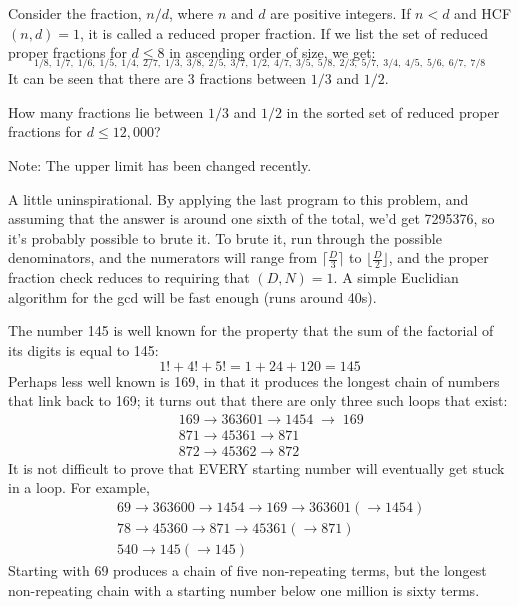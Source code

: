 


Consider the fraction, $n/d$, where $n$ and $d$ are positive integers. If $n<d$ and HCF$(n,d)=1$, it is called a reduced proper fraction.
If we list the set of reduced proper fractions for $d \leq 8$ in ascending order of size, we get:
\vspace{-0.25cm}
$$ _{1/8,\; 1/7, \; 1/6,\; 1/5,\; 1/4,\; 2/7,\; 1/3,\; 3/8,\; 2/5,\; 3/7,\; 1/2,\; 4/7,\; 3/5,\; 5/8,\; 2/3,\; 5/7,\; 3/4,\; 4/5,\; 5/6,\; 6/7,\; 7/8}$$
It can be seen that there are 3 fractions between $1/3$ and $1/2$.

How many fractions lie between $1/3$ and $1/2$ in the sorted set of reduced proper fractions for $d \leq 12,000$?

\footnotesize
Note: The upper limit has been changed recently.

\normalsize

A little uninspirational.  By applying the last program to this problem, and assuming that the answer is around one sixth of the total, we'd get 7295376, so it's probably possible to brute it.  To brute it, run through the possible denominators, and the numerators will range from $\lceil \tfrac D3 \rceil $ to $\lfloor \tfrac D2\rfloor$, and the proper fraction check reduces to requiring that $(D,N) = 1$.  A simple Euclidian algorithm for the gcd will be fast enough (runs around 40s).




The number 145 is well known for the property that the sum of the factorial of its digits is equal to 145:
$$1! + 4! + 5! = 1 + 24 + 120 = 145$$
Perhaps less well known is 169, in that it produces the longest chain of numbers that link back to 169; it turns out that there are only three such loops that exist:
\begin{eqnarray*}
&&169 \to 363601 \to 1454 \;\to \;169   \\
&&871 \to 45361  \to 871                 \\
&&872 \to 45362  \to 872
\end{eqnarray*}
It is not difficult to prove that EVERY starting number will eventually get stuck in a loop. For example,
\begin{eqnarray*}
&&69 \to 363600 \to 1454 \to 169 \to 363601 (\to 1454) \\
&&78 \to 45360 \to 871 \to 45361 (\to 871) \\
&&540\to 145 (\to 145)
\end{eqnarray*}
Starting with 69 produces a chain of five non-repeating terms, but the longest non-repeating chain with a starting number below one million is sixty terms.

